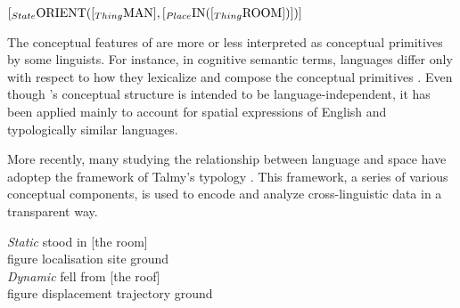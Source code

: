 
\begin{exe}
\ex\label{ex:SPA-jackendoff}
$[_{State}  \textnormal{ORIENT} ([_{Thing}   \textnormal{MAN}], [_{Place}  
\textnormal{IN} ([_{Thing}  \textnormal{ROOM}])])]$
\end{exe}

The conceptual features of \cite{Jack83} are more or less interpreted as
conceptual primitives by some linguists. For instance, in cognitive  semantic
terms, languages differ only with respect to how they lexicalize and compose 
the conceptual primitives \citep{Talm83, Wier96}.  Even though  
\citeauthor{Jack83}'s  conceptual  structure is intended to be
language-independent, it has
been applied mainly to account for spatial expressions  of English and
typologically similar languages.  

More recently,  many studying the relationship between language and space
 have adoptep the framework of Talmy’s typology \citep{Talm00a}. This
framework, a
series of various conceptual components, is used to encode and analyze
cross-linguistic  data in a transparent way. 

\begin{exe}
\ex\label{ex:SPA-sta-dyn}
 \begin{xlist} 
\ex\label{ex:SPA-stat-Eng}{\it Static}
 stood in {[the room]}\\
{\sc figure}  {\sc localisation} {\sc site} {\sc ground}\\
  \ex\label{ex:SPA-dyn-Eng}{\it Dynamic}
  fell from {[the roof]}\\
{\sc figure}  {\sc displacement} {\sc trajectory} {\sc ground}\\
 \end{xlist}
\end{exe} 



